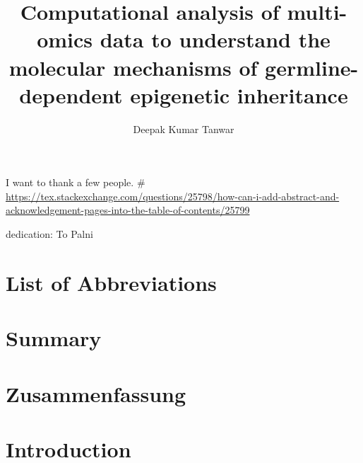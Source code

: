 \documentclass[12pt,twoside]{reedthesis}
\title{Computational analysis of multi-omics data to understand the molecular mechanisms of germline-dependent epigenetic inheritance}
\author{Deepak Kumar Tanwar}
\date{}
\begin{document}
  \maketitle

\frontmatter %
\pagestyle{empty} %
  \begin{acknowledgements}
    I want to thank a few people.
    \# \url{https://tex.stackexchange.com/questions/25798/how-can-i-add-abstract-and-acknowledgement-pages-into-the-table-of-contents/25799}

    dedication: \textbar{}
    To Palni
  \end{acknowledgements}

  \hypersetup{linkcolor=black}
  \setcounter{secnumdepth}{2}
  \setcounter{tocdepth}{2}
  \tableofcontents

  \listoftables

  \listoffigures



\mainmatter %
\pagestyle{fancyplain} %

\hypertarget{list-of-abbreviations}{%
\chapter*{List of Abbreviations}\label{list-of-abbreviations}}
\begin{acronym}[MPC]
\end{acronym}
\hypertarget{summary}{%
\chapter*{Summary}\label{summary}}

\hypertarget{summary-de}{%
\chapter*{Zusammenfassung}\label{summary-de}}

\hypertarget{intro}{%
\chapter*{Introduction}\label{intro}}
\end{document}

